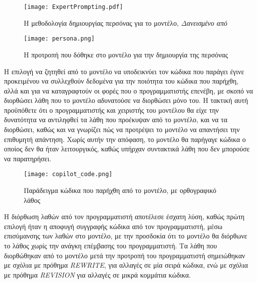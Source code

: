 \begin{figure}[H]
  \begin{center}
    \texttt{[image: ExpertPrompting.pdf]}
    \caption{Η μεθοδολογία δημιουργίας περσόνας για το μοντέλο,
    \textit{Δανεισμένο από \cite{xu2023expertprompting}} }
  \end{center}
  \label{fig:ExpertPrompting}
\end{figure}

\begin{figure}[H]
  \begin{center}
    \texttt{[image: persona.png]}
    \caption{Η προτροπή που δόθηκε στο μοντέλο για την δημιουργία της
    περσόνας}
  \end{center}
  \label{fig:persona}
\end{figure}

Η επιλογή να ζητηθεί από το μοντέλο να υποδεικνύει τον κώδικα που
παράγει έγινε προκειμένου να συλλεχθούν δεδομένα για την ποιότητα του
κώδικα που παρήχθη, αλλά και για να καταγραφτούν οι φορές που ο
προγραμματιστής επενέβη, με σκοπό να διορθώσει λάθη που το μοντέλο
αδυνατούσε να διορθώσει μόνο του. Η τακτική αυτή προϋπόθετε ότι ο προγραμματιστής και
χειριστής του μοντέλου θα είχε την δυνατότητα να αντιληφθεί τα λάθη που
προέκυψαν από το μοντέλο, και να τα διορθώσει, καθώς και να γνωρίζει
πώς να προτρέψει το μοντέλο να απαντήσει την επιθυμητή απάντηση. Χωρίς
αυτήν την απόφαση, το μοντέλο θα παρήγαγε κώδικα ο οποίος δεν θα ήταν
λειτουργικός, καθώς υπήρχαν συντακτικά λάθη που δεν μπορούσε να
παρατηρήσει.

\begin{figure}[H]
  \begin{center}
    \texttt{[image: copilot\_code.png]}
    \caption{Παράδειγμα κώδικα που παρήχθη από το μοντέλο, με
    ορθογραφικό λάθος}
  \end{center}
  \label{fig:copilotCode}
\end{figure}

Η διόρθωση λαθών από τον προγραμματιστή αποτέλεσε έσχατη λύση, καθώς
πρώτη επιλογή ήταν η αποφυγή συγγραφής κώδικα από τον προγραμματιστή,
μέσω επισύμανσης των λαθών στο μοντέλο, με την προσδοκία ότι το μοντέλο
θα διόρθωνε το λάθος χωρίς την ανάγκη επέμβασης του προγραμματιστή. Τα
λάθη που διορθώθηκαν από το μοντέλο μετά την προτροπή του προγραμματιστή
σημειώθηκαν με σχόλια με πρόθημα \textlatin{\textit{REWRITE}}, για
αλλαγές σε μία σειρά κώδικα, ενώ με σχόλια με πρόθημα
\textlatin{\textit{REVISION}} για αλλαγές σε μικρά κομμάτια κώδικα.

